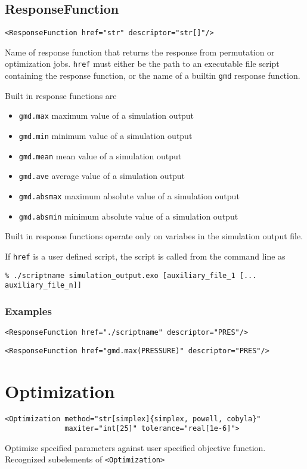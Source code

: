 \documentclass[11pt]{report}
\newcommand{\gmd}{\texttt{gmd}}
\renewcommand{\tag}[1]{\texttt{<#1>}}
\begin{document}
\subsection{ResponseFunction}
\begin{verbatim}
<ResponseFunction href="str" descriptor="str[]"/>
\end{verbatim}
Name of response function that returns the response from permutation or
optimization jobs. \texttt{href} must either be the path to an executable file
script containing the response function, or the name of a builtin \gmd{}
response function.

Built in response functions are
%
\begin{itemize}
  \item \texttt{gmd.max} maximum value of a simulation output
  \item \texttt{gmd.min} minimum value of a simulation output
  \item \texttt{gmd.mean} mean value of a simulation output
  \item \texttt{gmd.ave} average value of a simulation output
  \item \texttt{gmd.absmax} maximum absolute value of a simulation output
  \item \texttt{gmd.absmin} minimum absolute value of a simulation output
\end{itemize}
%
Built in response functions operate only on variabes in the simulation output file.

If \texttt{href} is a user defined script, the script is called from the
command line as
\begin{verbatim}
% ./scriptname simulation_output.exo [auxiliary_file_1 [... auxiliary_file_n]]
\end{verbatim}

\subsubsection{Examples}
\begin{verbatim}
<ResponseFunction href="./scriptname" descriptor="PRES"/>
\end{verbatim}


\begin{verbatim}
<ResponseFunction href="gmd.max(PRESSURE)" descriptor="PRES"/>
\end{verbatim}

\section{Optimization}
\begin{verbatim}
<Optimization method="str[simplex]{simplex, powell, cobyla}"
              maxiter="int[25]" tolerance="real[1e-6]">
\end{verbatim}
%
Optimize specified parameters against user specified objective function.
Recognized subelements of \tag{Optimization}
\end{document}
